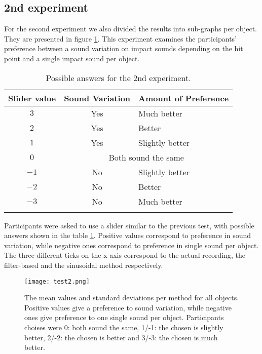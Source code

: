 \subsection{2nd experiment}
For the second experiment we also divided the results into sub-graphs per object. They are presented in figure \ref{fig:test2}. This experiment examines the participants' preference between a sound variation on impact sounds depending on the hit point and a single impact sound per object.

\begin{table}[H]
	\centering
    \begin{tabular}{  c  c  l  }
    \toprule
    \textbf{Slider value} & \textbf{Sound Variation} & \textbf{Amount of Preference} \\ \toprule
    \addlinespace
    $3$ & Yes & Much better \\ 
    $2$ & Yes & Better \\ 
    $1$ & Yes & Slightly better \\ 
    \addlinespace
    $0$ & \multicolumn{2}{c}{Both sound the same} \\ 
    \addlinespace
    $-1$ & No & Slightly better \\ 
    $-2$ & No & Better \\ 
    $-3$ & No & Much better \\
    \addlinespace
    \bottomrule
    \end{tabular}
    \caption{Possible answers for the 2nd experiment.}
    \label{tab:test2_ans}
\end{table}

Participants were asked to use a slider similar to the previous test, with possible answers shown in the table \ref{tab:test2_ans}. Positive values correspond to preference in sound variation, while negative ones correspond to preference in single sound per object. The three different ticks on the x-axis correspond to the actual recording, the filter-based and the sinusoidal method respectively. %

\begin{figure}[H]
  \centering
    \texttt{[image: test2.png]}
      \caption{The mean values and standard deviations per method for all objects. Positive values give a preference to sound variation, while negative ones give preference to one single sound per object. Participants choises were 0: both sound the same, 1/-1: the chosen is slightly better, 2/-2: the chosen is better and 3/-3: the chosen is much better.}\label{fig:test2}
\end{figure}

